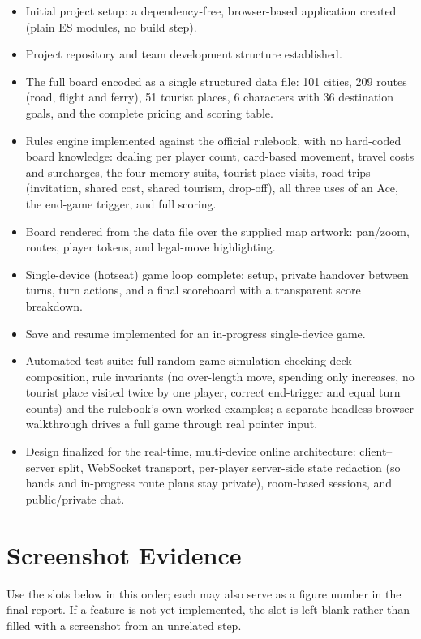 \documentclass[11pt]{article}
\begin{document}
\begin{itemize}[leftmargin=1.4em]
  \item Initial project setup: a dependency-free, browser-based application created (plain ES modules, no build step).
  \item Project repository and team development structure established.
  \item The full board encoded as a single structured data file: 101 cities, 209 routes (road, flight and ferry), 51 tourist places, 6 characters with 36 destination goals, and the complete pricing and scoring table.
  \item Rules engine implemented against the official rulebook, with no hard-coded board knowledge: dealing per player count, card-based movement, travel costs and surcharges, the four memory suits, tourist-place visits, road trips (invitation, shared cost, shared tourism, drop-off), all three uses of an Ace, the end-game trigger, and full scoring.
  \item Board rendered from the data file over the supplied map artwork: pan/zoom, routes, player tokens, and legal-move highlighting.
  \item Single-device (hotseat) game loop complete: setup, private handover between turns, turn actions, and a final scoreboard with a transparent score breakdown.
  \item Save and resume implemented for an in-progress single-device game.
  \item Automated test suite: full random-game simulation checking deck composition, rule invariants (no over-length move, spending only increases, no tourist place visited twice by one player, correct end-trigger and equal turn counts) and the rulebook's own worked examples; a separate headless-browser walkthrough drives a full game through real pointer input.
  \item Design finalized for the real-time, multi-device online architecture: client--server split, WebSocket transport, per-player server-side state redaction (so hands and in-progress route plans stay private), room-based sessions, and public/private chat.
\end{itemize}

\section{Screenshot Evidence}

Use the slots below in this order; each may also serve as a figure number in the final report. If a feature is not yet implemented, the slot is left blank rather than filled with a screenshot from an unrelated step.
\end{document}
